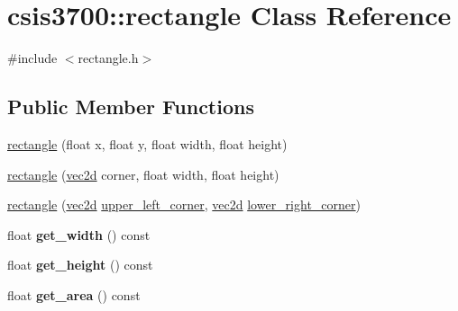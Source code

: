 \hypertarget{classcsis3700_1_1rectangle}{\section{csis3700\-:\-:rectangle Class Reference}
\label{classcsis3700_1_1rectangle}
}


{\ttfamily \#include $<$rectangle.\-h$>$}

\subsection*{Public Member Functions}
\begin{DoxyCompactItemize}
\item 
\hyperlink{classcsis3700_1_1rectangle_a12769987479c35eb82d4c327c5af31fb}{rectangle} (float x, float y, float width, float height)
\item 
\hyperlink{classcsis3700_1_1rectangle_a343355b4f013ac440b155d634ebc1c5c}{rectangle} (\hyperlink{classcsis3700_1_1vec2d}{vec2d} corner, float width, float height)
\item 
\hyperlink{classcsis3700_1_1rectangle_a65e217f0a67f76c2014b34f5995c689d}{rectangle} (\hyperlink{classcsis3700_1_1vec2d}{vec2d} \hyperlink{classcsis3700_1_1rectangle_aab0dc95e90e205d5e4f5e7f636fee8e3}{upper\-\_\-left\-\_\-corner}, \hyperlink{classcsis3700_1_1vec2d}{vec2d} \hyperlink{classcsis3700_1_1rectangle_a5ba599fc8d08e36be15c7d4e017f9d8b}{lower\-\_\-right\-\_\-corner})
\item 
\hypertarget{classcsis3700_1_1rectangle_afcf0790126b736866d883b51bdb5e2c2}{float {\bfseries get\-\_\-width} () const }\label{classcsis3700_1_1rectangle_afcf0790126b736866d883b51bdb5e2c2}

\item 
\hypertarget{classcsis3700_1_1rectangle_ae0826725dc934c151f5ad37b37c9c777}{float {\bfseries get\-\_\-height} () const }\label{classcsis3700_1_1rectangle_ae0826725dc934c151f5ad37b37c9c777}

\item 
\hypertarget{classcsis3700_1_1rectangle_a417cca148168261b1dd6df6f9379c435}{float {\bfseries get\-\_\-area} () const }\label{classcsis3700_1_1rectangle_a417cca148168261b1dd6df6f9379c435}


\end{DoxyCompactItemize}
